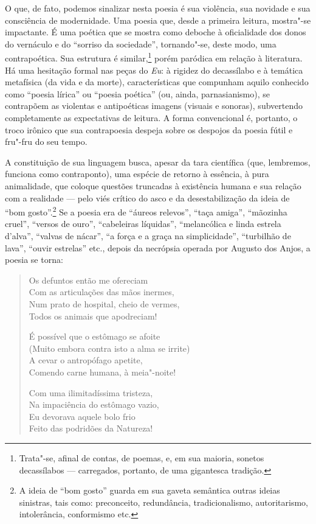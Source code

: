 O que, de fato, podemos sinalizar nesta poesia é sua violência, sua
novidade e sua consciência de modernidade. Uma poesia que, desde a
primeira leitura, mostra"-se impactante. É uma poética que se mostra
como deboche à oficialidade dos donos do vernáculo e do “sorriso da
sociedade”, tornando"-se, deste modo, uma contrapoética. Sua estrutura é
similar,\footnote{ Trata"-se, afinal de contas, de poemas, e, em sua
maioria, sonetos decassílabos --- carregados, portanto, de uma gigantesca
tradição.} porém paródica em relação à literatura. Há uma hesitação
formal nas peças do \textit{Eu}: à rigidez do decassílabo e à temática
metafísica (da vida e da morte), características que compunham aquilo
conhecido como “poesia lírica” ou “poesia poética” (ou, ainda,
parnasianismo), se contrapõem as violentas e antipoéticas imagens
(visuais e sonoras), subvertendo completamente as expectativas de
leitura. A forma convencional é, portanto, o troco irônico que sua
contrapoesia despeja sobre os despojos da poesia fútil e fru"-fru do seu
tempo. 

A constituição de sua linguagem busca, apesar da tara científica
(que, lembremos, funciona como contraponto), uma espécie de retorno à
essência, à pura animalidade, que coloque questões truncadas à
existência humana e sua relação com a realidade --- pelo viés crítico do
asco e da desestabilização da ideia de “bom gosto”.\footnote{ A ideia de
“bom gosto” guarda em sua gaveta semântica outras ideias sinistras,
tais como: preconceito, redundância, tradicionalismo, autoritarismo,
intolerância, conformismo etc.} Se a poesia era de “áureos relevos”,
“taça amiga”, “mãozinha cruel”, “versos de ouro”, “cabeleiras
líquidas”, “melancólica e linda estrela d’alva”, “valvas de nácar”, “a
força e a graça na simplicidade”, “turbilhão de lava”, “ouvir estrelas”
etc., depois da necrópsia operada por Augusto dos Anjos, a poesia se
torna: 

\begin{verse}
Os defuntos então me ofereciam \\
Com as articulações das mãos inermes,\\
Num prato de hospital, cheio de vermes,\\
Todos os animais que apodreciam!

É possível que o estômago se afoite \\
(Muito embora contra isto a alma se irrite)\\
A cevar o antropófago apetite,\\
Comendo carne humana, à meia"-noite!

Com uma ilimitadíssima tristeza,\\
Na impaciência do estômago vazio,\\
Eu devorava aquele bolo frio\\
Feito das podridões da Natureza!
\end{verse}

